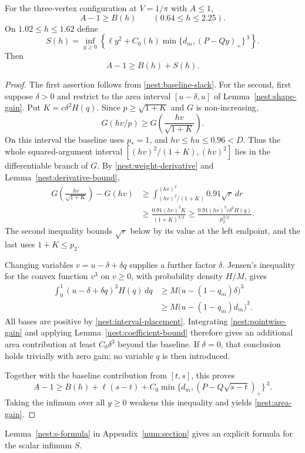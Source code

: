 \begin{proposition}\label{nest:area-bound}
For the three-vertex configuration at $V=1/\pi$ with $A\leq1$,
\[
 A-1\geq B(h)\qquad(0.64\leq h\leq2.25).
\]
On $1.02\leq h\leq1.62$ define
\begin{equation}\label{nest:gain-definition}
 S(h)=\inf_{y\geq0}
 \left\{\ell y^2+
   C_0(h)\min\{d_m,(P-Qy)_+\}^{\,3}\right\}.
\end{equation}
Then
\begin{equation}\label{nest:area-gain}
 A-1\geq B(h)+S(h).
\end{equation}
\end{proposition}

\begin{proof}
The first assertion follows from \eqref{nest:baseline-slack}.
For the second, first suppose $\delta>0$ and restrict to the area
interval $[u-\delta,u]$ of Lemma~\ref{nest:shape-gain}.  Put
$K=c\delta^2H(q)$.  Since $p\geq\sqrt{1+K}$ and $G$ is
non-increasing,
\[
 G(hv/p)\geq G\!\left(\frac{hv}{\sqrt{1+K}}\right).
\]
On this interval the baseline uses $p_*=1$, and
$hv\leq hu\leq0.96<D$.
Thus the whole squared-argument interval
$[(hv)^2/(1+K),(hv)^2]$ lies in the differentiable branch of $G$.
By \eqref{nest:weight-derivative} and
Lemma~\ref{nest:derivative-bound},
\begin{equation}\label{nest:pointwise-gain}
 \begin{split}
 G\!\left(\frac{hv}{\sqrt{1+K}}\right)-G(hv)
 &\geq \int_{(hv)^2/(1+K)}^{(hv)^2}0.91\sqrt r\,dr\\
 &\geq\frac{0.91(hv)^3K}{(1+K)^{3/2}}
 \geq\frac{0.91(hv)^3c\delta^2H(q)}{p_2^{3/2}}.
 \end{split}
\end{equation}
The second inequality bounds $\sqrt r$ below by its value at the
left endpoint, and the last uses $1+K\leq p_2$.

Changing variables $v=u-\delta+\delta q$ supplies a further factor
$\delta$.  Jensen's inequality for the convex function $v^3$ on
$v\geq0$, with probability density $H/M$, gives
\[
 \begin{split}
 \int_0^1 (u-\delta+\delta q)^3H(q)\,dq
 &\geq M\bigl(u-(1-q_m)\delta\bigr)^3\\
 &\geq M\bigl(u-(1-q_m)d_m\bigr)^3.
 \end{split}
\]
All bases are positive by \eqref{nest:interval-placement}.
Integrating \eqref{nest:pointwise-gain} and applying
Lemma~\ref{nest:coefficient-bound} therefore gives an additional
area contribution at least $C_0\delta^3$ beyond the baseline.
If $\delta=0$, that conclusion holds trivially with zero gain;
no variable $q$ is then introduced.

Together with the baseline contribution from $[t,s]$, this proves
\[
 A-1\geq B(h)+\ell(s-t)+
 C_0\min\{d_m,(P-Q\sqrt{s-t})_+\}^{\,3}.
\]
Taking the infimum over all $y\geq0$ weakens this inequality and
yields \eqref{nest:area-gain}.
\end{proof}

Lemma~\ref{nest:s-formula} in Appendix~\ref{num:section} gives an
explicit formula for the scalar infimum $S$.
